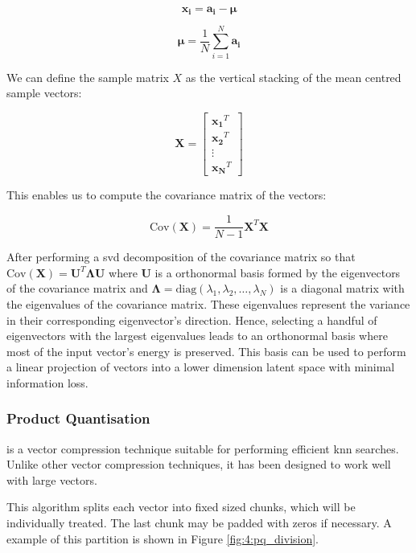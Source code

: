 \documentclass[../main.tex]{subfiles}
\begin{document}
\begin{equation}
    \bm{x_i} = \bm{a_i} - \bm{\mu}
\end{equation}

\begin{equation}
    \bm{\mu} = \frac{1}{N}\sum_{i=1}^{N} \bm{a_i}
\end{equation}

We can define the sample matrix $X$ as the vertical stacking of the mean centred sample vectors:

\begin{equation}
    \bm{X} = 
    \begin{bmatrix}
        \bm{x_1}^T \\
        \bm{x_2}^T \\
        \vdots \\
        \bm{x_N}^T
    \end{bmatrix}
\end{equation}

This enables us to compute the covariance matrix of the vectors:

\begin{equation}
    \text{Cov}(\bm{X}) = \frac{1}{N-1} \bm{X}^T \bm{X}
\end{equation}

After performing a \gls{svd} decomposition of the covariance matrix so that $\text{Cov}(\bm{X}) = \bm{U}^T \bm{\Lambda} \bm{U}$ where $\bm{U}$ is a orthonormal basis formed by the eigenvectors of the covariance matrix and $\bm{\Lambda} = \text{diag}(\lambda_1, \lambda_2, \dots, \lambda_N)$ is a diagonal matrix with the eigenvalues of the covariance matrix. These eigenvalues represent the variance in their corresponding eigenvector's direction. Hence, selecting a handful of eigenvectors with the largest eigenvalues leads to an orthonormal basis where most of the input vector's energy is preserved.  This basis can be used to perform a linear projection of vectors into a lower dimension latent space with minimal information loss.
 
\subsubsection{Product Quantisation}
 is a vector compression technique suitable for performing efficient \gls{knn} searches. Unlike other vector compression techniques, it has been designed to work well with large vectors\cite{chang2022a}\cite{jegou2011}.

This algorithm splits each vector into fixed sized chunks, which will be individually treated. The last chunk may be padded with zeros if necessary. A example of this partition is shown in Figure \ref{fig:4:pq_division}.
\end{document}
